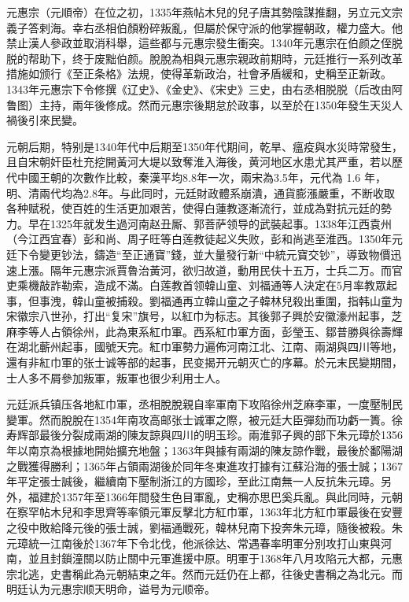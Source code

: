 元惠宗（元順帝）在位之初，1335年燕帖木兒的兒子唐其勢陰謀推翻，另立元文宗義子答剌海。幸右丞相伯顏粉碎叛亂，但屬於保守派的他掌握朝政，權力盛大。他禁止漢人參政並取消科舉，這些都与元惠宗發生衝突。1340年元惠宗在伯颜之侄脱脱的帮助下，终于废黜伯颜。脫脫為相與元惠宗親政前期時，元廷推行一系列改革措施如颁行《至正条格》法規，使得革新政治，社會矛盾緩和，史稱至正新政。1343年元惠宗下令修撰《辽史》、《金史》、《宋史》三史，由右丞相脱脱（后改由阿鲁图）主持，兩年後修成。然而元惠宗後期怠於政事，以至於在1350年發生天災人禍後引來民變。

元朝后期，特别是1340年代中后期至1350年代期间，乾旱、瘟疫與水災時常發生，且自宋朝奸臣杜充挖開黃河大堤以致奪淮入海後，黄河地区水患尤其严重，若以歷代中國王朝的次數作比較，秦漢平均8.8年一次，兩宋為3.5年，元代為 1.6 年，明、清兩代均為2.8年。与此同时，元廷財政體系崩潰，通貨膨漲嚴重，不断收取各种赋税，使百姓的生活更加艰苦，使得白蓮教逐漸流行，並成為對抗元廷的勢力。早在1325年就发生過河南赵丑厮、郭菩萨领导的武裝起事。1338年江西袁州（今江西宜春）彭和尚、周子旺等白莲教徒起义失败，彭和尚逃至淮西。1350年元廷下令變更钞法，鑄造“至正通寶”錢，並大量發行新“中統元寶交钞”，導致物價迅速上漲。隔年元惠宗派賈魯治黃河，欲归故道，動用民伕十五万，士兵二万。而官吏乘機敲詐勒索，造成不滿。白莲教首领韓山童、刘福通等人決定在5月率教眾起事，但事洩，韓山童被捕殺。劉福通再立韓山童之子韓林兒殺出重圍，指韩山童为宋徽宗八世孙，打出“复宋”旗号，以紅巾为标志。其後郭子興於安徽濠州起事，芝麻李等人占領徐州，此為東系紅巾軍。西系紅巾軍方面，彭瑩玉、鄒普勝與徐壽輝在湖北蘄州起事，國號天完。紅巾軍勢力遍佈河南江北、江南、兩湖與四川等地，還有非紅巾軍的张士诚等部的起事，民变揭开元朝灭亡的序幕。於元末民變期間，士人多不屑參加叛軍，叛軍也很少利用士人。

元廷派兵镇压各地紅巾軍，丞相脫脫親自率軍南下攻陷徐州芝麻李軍，一度壓制民變軍。然而脫脫在1354年南攻高邮张士诚軍之際，被元廷大臣彈劾而功虧一簣。徐寿辉部最後分裂成兩湖的陳友諒與四川的明玉珍。兩淮郭子興的部下朱元璋於1356年以南京為根據地開始擴充地盤；1363年與據有兩湖的陳友諒作戰，最後於鄱陽湖之戰獲得勝利；1365年占領兩湖後於同年冬東進攻打據有江蘇沿海的張士誠；1367年平定張士誠後，繼續南下壓制浙江的方國珍，至此江南無一人反抗朱元璋。另外，福建於1357年至1366年間發生色目軍亂，史稱亦思巴奚兵亂。與此同時，元朝在察罕帖木兒和李思齊等率領元軍反擊北方紅巾軍，1363年北方紅巾軍最後在安豐之役中敗給降元後的張士誠，劉福通戰死，韓林兒南下投奔朱元璋，隨後被殺。朱元璋統一江南後於1367年下令北伐，他派徐达、常遇春率明軍分別攻打山東與河南，並且封鎖潼關以防止關中元軍進援中原。明軍于1368年八月攻陷元大都，元惠宗北逃，史書稱此為元朝結束之年。然而元廷仍在上都，往後史書稱之為北元。而明廷认为元惠宗顺天明命，谥号为元顺帝。

